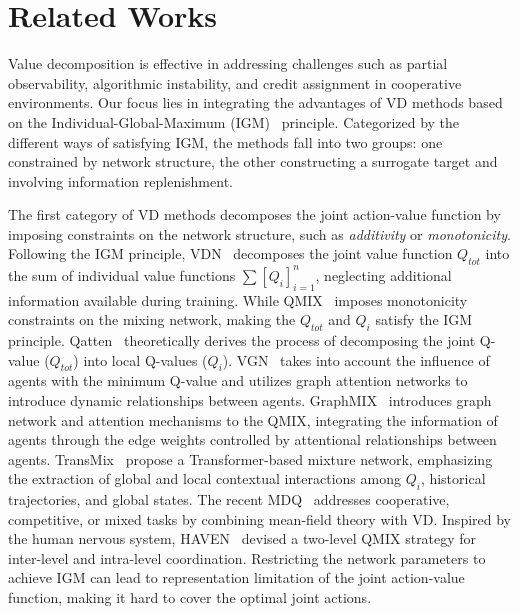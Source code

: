 \section{Related Works}
\label{}
Value decomposition is effective in addressing challenges such as partial observability, algorithmic instability, and credit assignment in cooperative environments.
Our focus lies in integrating the advantages of VD methods based on the Individual-Global-Maximum (IGM)~\cite{son2019qtran} principle. Categorized by the different ways of satisfying IGM, the methods fall into two groups: one constrained by network structure, the other constructing a surrogate target and involving information replenishment.

The first category of VD methods decomposes the joint action-value function by imposing constraints on the network structure, such as \textit{additivity} or \textit{monotonicity}. Following the IGM principle, VDN~\cite{sunehag2017value} decomposes the joint value function $Q_{tot}$ into the sum of individual value functions $\sum [Q_{i}]_{i=1}^{n}$, neglecting additional information available during training. While QMIX~\cite{rashid_qmix_2018} imposes monotonicity constraints on the mixing network, making the $Q_{tot}$ and $Q_{i}$ satisfy the IGM principle.
Qatten~\cite{yang2020qatten} theoretically derives the process of decomposing the joint Q-value ($Q_{tot}$) into local Q-values ($Q_{i}$).
VGN~\cite{wei2022vgn} takes into account the influence of agents with the minimum Q-value and utilizes graph attention networks to introduce dynamic relationships between agents.
GraphMIX~\cite{naderializadeh2020graph} introduces graph network and attention mechanisms to the QMIX, integrating the information of agents through the edge weights controlled by attentional relationships between agents.
TransMix~\cite{khan2022transformer} propose a Transformer-based mixture network, emphasizing the extraction of global and local contextual interactions among $Q_i$, historical trajectories, and global states.
The recent MDQ~\cite{ding2023multi} addresses cooperative, competitive, or mixed tasks by combining mean-field theory with VD.
Inspired by the human nervous system, HAVEN~\cite{xu2023haven} devised a two-level QMIX strategy for inter-level and intra-level coordination.
Restricting the network parameters to achieve IGM can lead to representation limitation of the joint action-value function, making it hard to cover the optimal joint actions.


